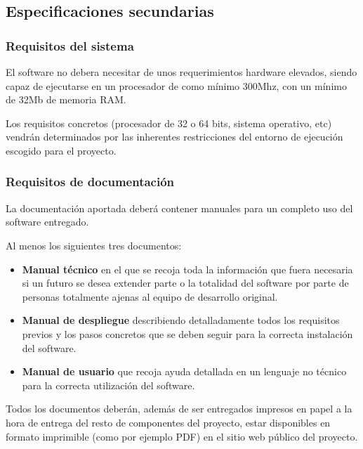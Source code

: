 
\subsection{Especificaciones secundarias}

\subsubsection{Requisitos del sistema} 

El software no debera necesitar de unos requerimientos hardware elevados, 
siendo capaz de ejecutarse en un procesador de como mínimo 300Mhz, con 
un mínimo de 32Mb de memoria RAM. 

Los requisitos concretos (procesador de 32 o 64 bits, sistema operativo, 
etc) vendrán determinados por las inherentes restricciones del entorno de 
ejecución escogido para el proyecto.

\subsubsection{Requisitos de documentación} 

La documentación aportada deberá contener manuales para un completo uso 
del software entregado.

Al menos los siguientes tres documentos:

\begin{itemize}
  \item \textbf{Manual técnico} en el que se recoja toda la información que 
	fuera necesaria si un futuro se desea extender parte o la totalidad 
	del software por parte de personas totalmente ajenas al equipo de 
	desarrollo original.
  \item \textbf{Manual de despliegue} describiendo detalladamente todos los 
	requisitos previos y los pasos concretos que se deben seguir para la 
	correcta instalación del software.
  \item \textbf{Manual de usuario} que recoja ayuda detallada en un lenguaje
	no técnico para la correcta utilización del software.
\end{itemize}

Todos los documentos deberán, además de ser entregados impresos en papel a la
hora de entrega del resto de componentes del proyecto, estar disponibles en
formato imprimible (como por ejemplo PDF) en el sitio web público del proyecto.
